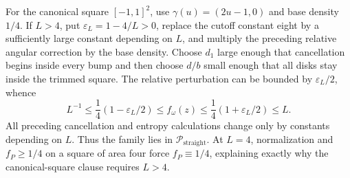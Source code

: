 For the canonical square \([-1,1]^2\), use \(\gamma(u)=(2u-1,0)\) and base density \(1/4\).  If \(L>4\), put \(\varepsilon_L=1-4/L>0\), replace the cutoff constant eight by a sufficiently large constant depending on \(L\), and multiply the preceding relative angular correction by the base density.  Choose \(d_1\) large enough that cancellation begins inside every bump and then choose \(d/b\) small enough that all disks stay inside the trimmed square.  The relative perturbation can be bounded by \(\varepsilon_L/2\), whence
\[
 L^{-1}\leq\frac14(1-\varepsilon_L/2)
 \leq f_\omega(z)
 \leq\frac14(1+\varepsilon_L/2)\leq L.
\]
All preceding cancellation and entropy calculations change only by constants depending on \(L\).  Thus the family lies in \(\mathcal P_{\mathrm{straight}}\).  At \(L=4\), normalization and \(f_P\geq1/4\) on a square of area four force \(f_P\equiv1/4\), explaining exactly why the canonical-square clause requires \(L>4\).